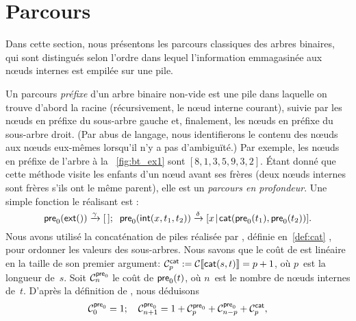 \section{Parcours}
\label{sec:traversals}

Dans cette section, nous présentons les parcours classiques des arbres
binaires, qui sont distingués selon l'ordre dans lequel l'information
emmagasinée aux nœuds internes est empilée sur une pile.

\label{preorder}

Un parcours \emph{préfixe} d'un arbre
binaire non-vide est une pile dans laquelle on trouve d'abord la
racine (récursivement, le nœud interne courant), suivie par les
nœuds en préfixe du sous-arbre gauche et, finalement, les
nœuds en préfixe du sous-arbre droit. (Par abus de langage, nous
identifierons le contenu des nœuds aux nœuds eux-mêmes
lorsqu'il n'y a pas d'ambiguïté.) Par exemple, les nœuds en
préfixe de l'arbre à la \fig~\vref{fig:bt_ex1} sont
\([8,1,3,5,9,3,2]\). Étant donné que cette méthode visite les enfants
d'un nœud avant ses frères (deux
nœuds internes sont frères s'ils ont le même parent), elle est un
\emph{parcours en profondeur}. Une simple fonction le réalisant est :
\begin{equation}
\fun{pre}_0(\fun{ext}()) \xrightarrow{\smash{\gamma}} \el;
\;\;
\fun{pre}_0(\fun{int}(x,t_1,t_2)) \xrightarrow{\smash{\delta}}
 \cons{x}{\fun{cat}(\fun{pre}_0(t_1),\fun{pre}_0(t_2))}.
\label{eq:pre0}
\index{pre0@\fun{pre\(_0\)/1}}
\end{equation}
Nous avons utilisé la concaténation de piles
réalisée par , définie
en~\eqref{def:cat} , pour ordonner les valeurs des
sous-arbres. Nous savons que le coût de  est linéaire en la
taille de son premier argument: \(\C{\fun{cat}}{p} :=
\Call{\fun{cat}(s,t)} = p+1\), où \(p\)~est la longueur de~\(s\). Soit
\(\C{\fun{pre}_0}{n}\) le coût de
\(\fun{pre}_0(t)\), où \(n\)~est le nombre de nœuds internes
de~\(t\). D'après la définition de , nous déduisons
\begin{equation*}
\C{\fun{pre}_0}{0} = 1;\quad
\C{\fun{pre}_0}{n+1} =
  1 + \C{\fun{pre}_0}{p} + \C{\fun{pre}_0}{n-p} + \C{\fun{cat}}{p},
\index{pre0@$\C{\fun{pre}_0}{n}$}
\end{equation*}
